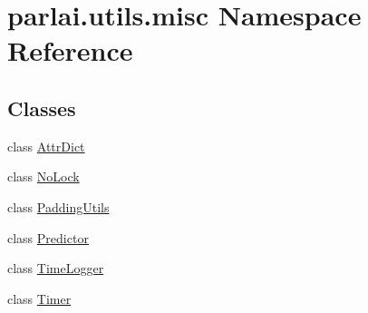 \hypertarget{namespaceparlai_1_1utils_1_1misc}{}\section{parlai.\+utils.\+misc Namespace Reference}
\label{namespaceparlai_1_1utils_1_1misc}
\subsection*{Classes}
\begin{DoxyCompactItemize}
\item 
class \hyperlink{classparlai_1_1utils_1_1misc_1_1AttrDict}{Attr\+Dict}
\item 
class \hyperlink{classparlai_1_1utils_1_1misc_1_1NoLock}{No\+Lock}
\item 
class \hyperlink{classparlai_1_1utils_1_1misc_1_1PaddingUtils}{Padding\+Utils}
\item 
class \hyperlink{classparlai_1_1utils_1_1misc_1_1Predictor}{Predictor}
\item 
class \hyperlink{classparlai_1_1utils_1_1misc_1_1TimeLogger}{Time\+Logger}
\item 
class \hyperlink{classparlai_1_1utils_1_1misc_1_1Timer}{Timer}
\end{DoxyCompactItemize}
